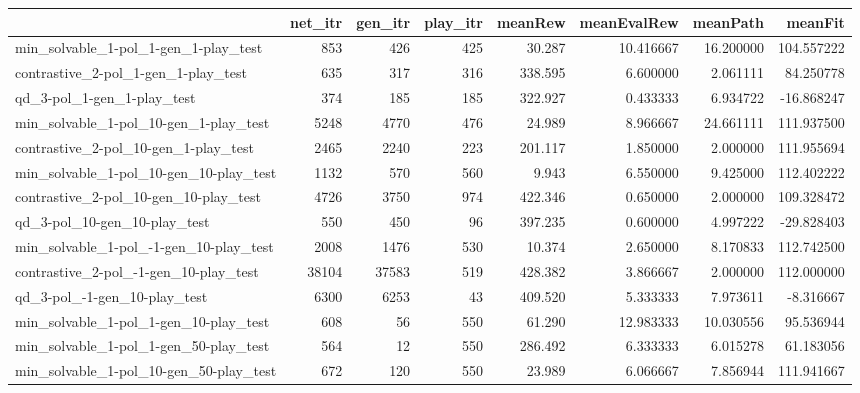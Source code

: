 \begin{tabular}{lrrrrrrr}
\toprule
{} &  net\_itr &  gen\_itr &  play\_itr &  meanRew &  meanEvalRew &   meanPath &     meanFit \\
\midrule
min\_solvable\_1-pol\_1-gen\_1-play\_test   &      853 &      426 &       425 &   30.287 &    10.416667 &  16.200000 &  104.557222 \\
contrastive\_2-pol\_1-gen\_1-play\_test    &      635 &      317 &       316 &  338.595 &     6.600000 &   2.061111 &   84.250778 \\
qd\_3-pol\_1-gen\_1-play\_test             &      374 &      185 &       185 &  322.927 &     0.433333 &   6.934722 &  -16.868247 \\
min\_solvable\_1-pol\_10-gen\_1-play\_test  &     5248 &     4770 &       476 &   24.989 &     8.966667 &  24.661111 &  111.937500 \\
contrastive\_2-pol\_10-gen\_1-play\_test   &     2465 &     2240 &       223 &  201.117 &     1.850000 &   2.000000 &  111.955694 \\
min\_solvable\_1-pol\_10-gen\_10-play\_test &     1132 &      570 &       560 &    9.943 &     6.550000 &   9.425000 &  112.402222 \\
contrastive\_2-pol\_10-gen\_10-play\_test  &     4726 &     3750 &       974 &  422.346 &     0.650000 &   2.000000 &  109.328472 \\
qd\_3-pol\_10-gen\_10-play\_test           &      550 &      450 &        96 &  397.235 &     0.600000 &   4.997222 &  -29.828403 \\
min\_solvable\_1-pol\_-1-gen\_10-play\_test &     2008 &     1476 &       530 &   10.374 &     2.650000 &   8.170833 &  112.742500 \\
contrastive\_2-pol\_-1-gen\_10-play\_test  &    38104 &    37583 &       519 &  428.382 &     3.866667 &   2.000000 &  112.000000 \\
qd\_3-pol\_-1-gen\_10-play\_test           &     6300 &     6253 &        43 &  409.520 &     5.333333 &   7.973611 &   -8.316667 \\
min\_solvable\_1-pol\_1-gen\_10-play\_test  &      608 &       56 &       550 &   61.290 &    12.983333 &  10.030556 &   95.536944 \\
min\_solvable\_1-pol\_1-gen\_50-play\_test  &      564 &       12 &       550 &  286.492 &     6.333333 &   6.015278 &   61.183056 \\
min\_solvable\_1-pol\_10-gen\_50-play\_test &      672 &      120 &       550 &   23.989 &     6.066667 &   7.856944 &  111.941667 \\

\end{tabular}
